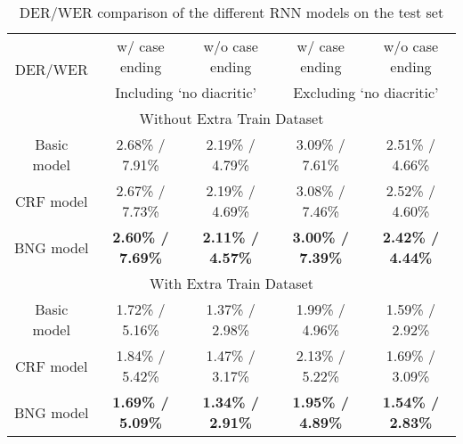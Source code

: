 \documentclass[11pt,a4paper]{article}
\begin{document}
\begin{table*}[h]
\centering
\caption{DER/WER comparison of the different RNN models on the test set}
\label{tab:rnn_derwer}
\begin{tabular}{|c|c|c|c|c|}
\hline
\multirow{2}{*}{DER/WER} & w/ case ending         & w/o case ending        & w/ case ending         & w/o case ending        \\ \cline{2-5} 
                         & \multicolumn{2}{c|}{Including `no diacritic'}   & \multicolumn{2}{c|}{Excluding `no diacritic'}   \\ \hline
\multicolumn{5}{|c|}{Without Extra Train Dataset}                                                                            \\ \hline
Basic model              & \small2.68\% / \small7.91\%          & \small2.19\% / \small4.79\%          & \small3.09\% / \small7.61\%          & \small2.51\% / \small4.66\%          \\ \hline
CRF model                & \small2.67\% / \small7.73\%          & \small2.19\% / \small4.69\%          & \small3.08\% / \small7.46\%          & \small2.52\% / \small4.60\%           \\ \hline
BNG model                & \textbf{\small2.60\% / \small7.69\%}  & \textbf{\small2.11\% / \small4.57\%} & \textbf{\small3.00\% / \small7.39\%} & \textbf{\small2.42\% / \small4.44\%} \\ \hline
\multicolumn{5}{|c|}{With Extra Train Dataset}                                                                               \\ \hline
Basic model              & \small1.72\% / \small5.16\%          & \small1.37\% / \small2.98\%          & \small1.99\% / \small4.96\%          & \small1.59\% / \small2.92\%          \\ \hline
CRF model                & \small1.84\% / \small5.42\%          & \small1.47\% / \small3.17\%          & \small2.13\% / \small5.22\%          & \small1.69\% / \small3.09\%          \\ \hline
BNG model                & \textbf{\small1.69\% / \small5.09\%} & \textbf{\small1.34\% / 2.91\%} & \textbf{\small1.95\% / \small4.89\%} & \textbf{\small1.54\% / \small2.83\%} \\ \hline
\end{tabular}
\end{table*}
\end{document}
